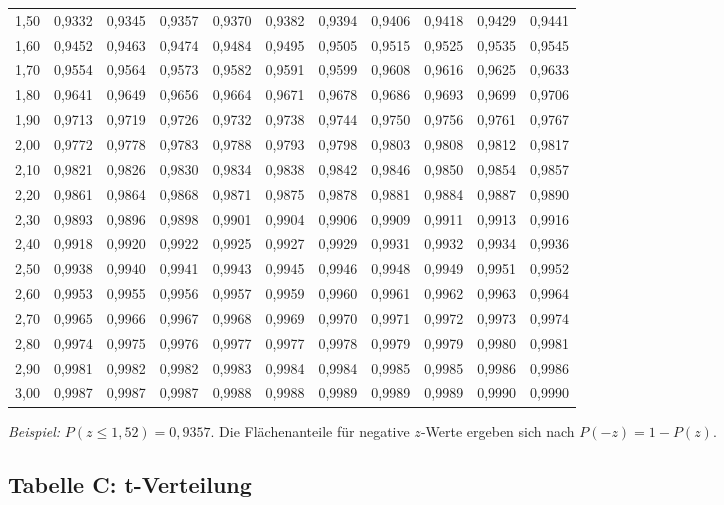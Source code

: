 \documentclass[
]{article}
\begin{document}
\begin{table}[!h]
{\begin{tabular}[t]{lcccccccccc}
1,50 & 0,9332 & 0,9345 & 0,9357 & 0,9370 & 0,9382 & 0,9394 & 0,9406 & 0,9418 & 0,9429 & 0,9441\\
1,60 & 0,9452 & 0,9463 & 0,9474 & 0,9484 & 0,9495 & 0,9505 & 0,9515 & 0,9525 & 0,9535 & 0,9545\\
1,70 & 0,9554 & 0,9564 & 0,9573 & 0,9582 & 0,9591 & 0,9599 & 0,9608 & 0,9616 & 0,9625 & 0,9633\\
1,80 & 0,9641 & 0,9649 & 0,9656 & 0,9664 & 0,9671 & 0,9678 & 0,9686 & 0,9693 & 0,9699 & 0,9706\\
1,90 & 0,9713 & 0,9719 & 0,9726 & 0,9732 & 0,9738 & 0,9744 & 0,9750 & 0,9756 & 0,9761 & 0,9767\\
2,00 & 0,9772 & 0,9778 & 0,9783 & 0,9788 & 0,9793 & 0,9798 & 0,9803 & 0,9808 & 0,9812 & 0,9817\\
2,10 & 0,9821 & 0,9826 & 0,9830 & 0,9834 & 0,9838 & 0,9842 & 0,9846 & 0,9850 & 0,9854 & 0,9857\\
2,20 & 0,9861 & 0,9864 & 0,9868 & 0,9871 & 0,9875 & 0,9878 & 0,9881 & 0,9884 & 0,9887 & 0,9890\\
2,30 & 0,9893 & 0,9896 & 0,9898 & 0,9901 & 0,9904 & 0,9906 & 0,9909 & 0,9911 & 0,9913 & 0,9916\\
2,40 & 0,9918 & 0,9920 & 0,9922 & 0,9925 & 0,9927 & 0,9929 & 0,9931 & 0,9932 & 0,9934 & 0,9936\\
2,50 & 0,9938 & 0,9940 & 0,9941 & 0,9943 & 0,9945 & 0,9946 & 0,9948 & 0,9949 & 0,9951 & 0,9952\\
2,60 & 0,9953 & 0,9955 & 0,9956 & 0,9957 & 0,9959 & 0,9960 & 0,9961 & 0,9962 & 0,9963 & 0,9964\\
2,70 & 0,9965 & 0,9966 & 0,9967 & 0,9968 & 0,9969 & 0,9970 & 0,9971 & 0,9972 & 0,9973 & 0,9974\\
2,80 & 0,9974 & 0,9975 & 0,9976 & 0,9977 & 0,9977 & 0,9978 & 0,9979 & 0,9979 & 0,9980 & 0,9981\\
2,90 & 0,9981 & 0,9982 & 0,9982 & 0,9983 & 0,9984 & 0,9984 & 0,9985 & 0,9985 & 0,9986 & 0,9986\\
3,00 & 0,9987 & 0,9987 & 0,9987 & 0,9988 & 0,9988 & 0,9989 & 0,9989 & 0,9989 & 0,9990 & 0,9990\\
\bottomrule
\end{tabular}}
\end{table}

\emph{Beispiel:} \(P(z \leq 1{,}52) = 0{,}9357\). Die Flächenanteile für
negative \(z\)-Werte ergeben sich nach \(P(-z) = 1 - P(z)\).

\newpage

\subsection{Tabelle C: t-Verteilung}\label{tabelle-c-t-verteilung}
\end{document}
